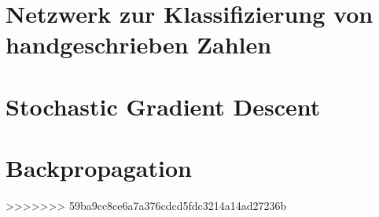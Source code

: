 \section{Netzwerk zur Klassifizierung von handgeschrieben Zahlen}

\section{Stochastic Gradient Descent}

\section{Backpropagation}
>>>>>>> 59ba9cc8ce6a7a376cdcd5fdc3214a14ad27236b

